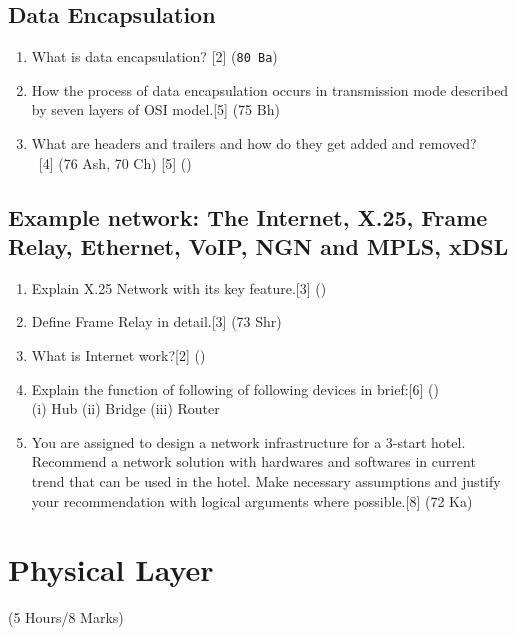 \documentclass[12pt]{article}
\newcommand{\enter}{\\\textcolor{white}{1}}
\begin{document}
		\subsection{Data Encapsulation}
		\begin{enumerate}[noitemsep, topsep = 0pt]
			\item What is data encapsulation? \hfill [2] (\texttt{80 Ba})
			
			\item How the process of data encapsulation occurs in transmission mode described by seven layers of OSI model.\hfill[5] (75 Bh)

			\item What are headers and trailers and how do they get added and removed?
		\enter\hfill[4] (76 Ash, 70 Ch) [5] () 
		\end{enumerate}

		\subsection{Example network: The Internet, X.25, Frame Relay, Ethernet, VoIP, NGN and MPLS, xDSL}
		\begin{enumerate}[noitemsep, topsep = 0pt]
			\item Explain X.25 Network with its key feature.\hfill[3] ()

			\item Define Frame Relay in detail.\hfill[3] (73 Shr)

			\item What is Internet work?\hfill[2] ()

			\item Explain the function of following of following devices in brief:\hfill[6] ()\\
			(i) Hub (ii) Bridge (iii) Router
			
			\item You are assigned to design a network infrastructure for a 3-start hotel. Recommend a network solution with hardwares and softwares in current trend that can be used in the hotel. Make necessary assumptions and justify your recommendation with logical arguments where possible.\hfill[8] (72 Ka)
		\end{enumerate}

	\pagebreak

\section{Physical Layer}
	\begin{center}(5 Hours/8 Marks)\end{center}
\end{document}
